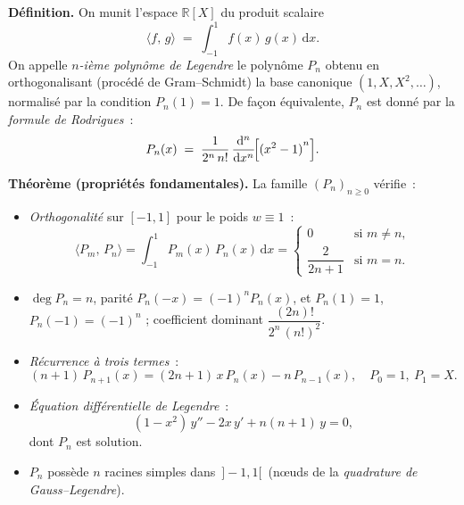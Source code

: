 

\newcommand{\psL}[2]{\langle #1,\,#2\rangle}


\begin{tcolorbox}[thmbox]
  \textbf{Définition.}\enspace{}
  On munit l'espace $\mathbb{R}[X]$ du produit scalaire
  \[
    \psL{f}{g} \;=\; \int_{-1}^{1} f(x)\,g(x)\,\mathrm{d}x.
  \]
  On appelle \emph{$n$-ième polynôme de Legendre} le polynôme $P_n$ obtenu en
  orthogonalisant (procédé de Gram--Schmidt) la base canonique
  $(1,X,X^2,\ldots)$, normalisé par la condition $P_n(1)=1$.
  De façon équivalente, $P_n$ est donné par la
  \emph{formule de Rodrigues}~:
  \[
    P_n(x) \;=\; \frac{1}{2^n\,n!}\,
    \frac{\mathrm{d}^n}{\mathrm{d}x^n}\!\Bigl[{(x^2-1)}^n\Bigr].
  \]

  \medskip
  \textbf{Théorème (propriétés fondamentales).}\enspace%
  La famille ${(P_n)}_{n\geq 0}$ vérifie~:
  \begin{itemize}
    \item \textit{Orthogonalité} sur $[-1,1]$ pour le poids $w\equiv 1$~:
    \[
      \psL{P_m}{P_n} = \int_{-1}^{1} P_m(x)\,P_n(x)\,\mathrm{d}x
      = \begin{cases}
          0 & \text{si } m\neq n,\\[2pt]
          \dfrac{2}{2n+1} & \text{si } m=n.
        \end{cases}
    \]
    \item $\deg P_n = n$, parité $P_n(-x)={(-1)}^n P_n(x)$, et
          $P_n(1)=1$, $P_n(-1)={(-1)}^n$ ; coefficient dominant
          $\dfrac{(2n)!}{2^n\,{(n!)}^2}$.
    \item \textit{Récurrence à trois termes}~:
    \[
      (n+1)\,P_{n+1}(x) = (2n+1)\,x\,P_n(x) - n\,P_{n-1}(x),
      \quad P_0=1,\ P_1=X.
    \]
    \item \textit{Équation différentielle de Legendre}~:
    \[
      (1-x^2)\,y'' - 2x\,y' + n(n+1)\,y = 0,
    \]
    dont $P_n$ est solution.
    \item $P_n$ possède $n$ racines simples dans $\,]-1,1[\,$ (nœuds de la
          \emph{quadrature de Gauss--Legendre}).
  \end{itemize}
\end{tcolorbox}

